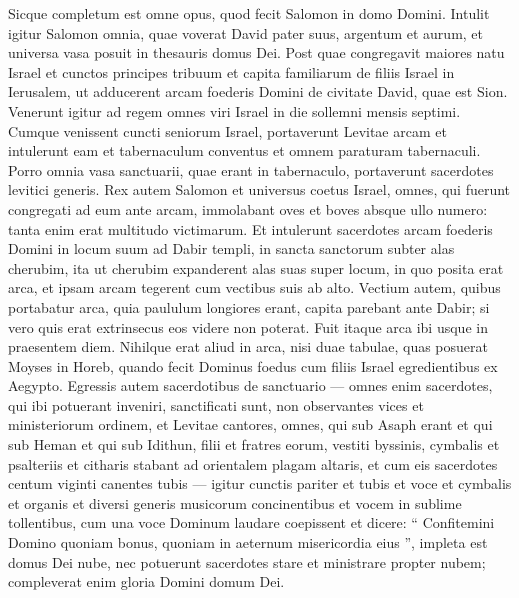 \begin{biblechapter}
\begin{biblechapter}
\begin{biblechapter}
\begin{biblechapter}
\begin{biblechapter}
\verse Sicque completum est omne opus, quod fecit Salomon in domo Domini. Intulit igitur Salomon omnia, quae voverat David pater suus, argentum et aurum, et universa vasa posuit in thesauris domus Dei.
 \verse Post quae congregavit maiores natu Israel et cunctos principes tribuum et capita familiarum de filiis Israel in Ierusalem, ut adducerent arcam foederis Domini de civitate David, quae est Sion. 
\verse Venerunt igitur ad regem omnes viri Israel in die sollemni mensis septimi. 
\verse Cumque venissent cuncti seniorum Israel, portaverunt Levitae arcam 
\verse et intulerunt eam et tabernaculum conventus et omnem paraturam tabernaculi. Porro omnia vasa sanctuarii, quae erant in tabernaculo, portaverunt sacerdotes levitici generis. 
 \verse Rex autem Salomon et universus coetus Israel, omnes, qui fuerunt congregati ad eum ante arcam, immolabant oves et boves absque ullo numero: tanta enim erat multitudo victimarum.
 \verse Et intulerunt sacerdotes arcam foederis Domini in locum suum ad Dabir templi, in sancta sanctorum subter alas cherubim, 
\verse ita ut cherubim expanderent alas suas super locum, in quo posita erat arca, et ipsam arcam tegerent cum vectibus suis ab alto. 
\verse Vectium autem, quibus portabatur arca, quia paululum longiores erant, capita parebant ante Dabir; si vero quis erat extrinsecus eos videre non poterat. Fuit itaque arca ibi usque in praesentem diem. 
\verse Nihilque erat aliud in arca, nisi duae tabulae, quas posuerat Moyses in Horeb, quando fecit Dominus foedus cum filiis Israel egredientibus ex Aegypto.
 \verse Egressis autem sacerdotibus de sanctuario — omnes enim sacerdotes, qui ibi potuerant inveniri, sanctificati sunt, non observantes vices et ministeriorum ordinem, 
\verse et Levitae cantores, omnes, qui sub Asaph erant et qui sub Heman et qui sub Idithun, filii et fratres eorum, vestiti byssinis, cymbalis et psalteriis et citharis stabant ad orientalem plagam altaris, et cum eis sacerdotes centum viginti canentes tubis — 
\verse igitur cunctis pariter et tubis et voce et cymbalis et organis et diversi generis musicorum concinentibus et vocem in sublime tollentibus, cum una voce Dominum laudare coepissent et dicere: “ Confitemini Domino quoniam bonus, quoniam in aeternum misericordia eius ”, impleta est domus Dei nube, 
\verse nec potuerunt sacerdotes stare et ministrare propter nubem; compleverat enim gloria Domini domum Dei.
 

\end{biblechapter}
\end{biblechapter}
\end{biblechapter}
\end{biblechapter}
\end{biblechapter}
